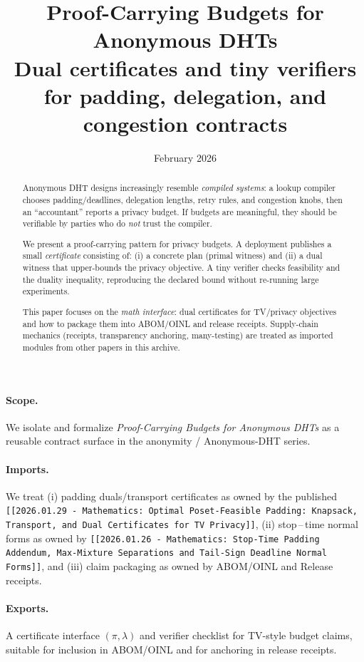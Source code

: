 \documentclass[11pt]{article}
\title{Proof-Carrying Budgets for Anonymous DHTs\\
\large Dual certificates and tiny verifiers for padding, delegation, and congestion contracts}
\author{}
\date{February 2026}
\begin{document}
\maketitle

\begin{abstract}
Anonymous DHT designs increasingly resemble \emph{compiled systems}: a lookup compiler chooses padding/deadlines, delegation lengths, retry rules, and congestion knobs, then an ``accountant'' reports a privacy budget.
If budgets are meaningful, they should be verifiable by parties who do \emph{not} trust the compiler.

We present a proof-carrying pattern for privacy budgets.
A deployment publishes a small \emph{certificate} consisting of: (i) a concrete plan (primal witness) and (ii) a dual witness that upper-bounds the privacy objective.
A tiny verifier checks feasibility and the duality inequality, reproducing the declared bound without re-running large experiments.

This paper focuses on the \emph{math interface}: dual certificates for TV/privacy objectives and how to package them into ABOM/OINL and release receipts.
Supply-chain mechanics (receipts, transparency anchoring, many-testing) are treated as imported modules from other papers in this archive.
\end{abstract}

\paragraph{Scope.}
We isolate and formalize \emph{Proof-Carrying Budgets for Anonymous DHTs} as a reusable contract surface in the anonymity / Anonymous-DHT series.

\paragraph{Imports.}
We treat (i) padding duals/transport certificates as owned by the published \texttt{[[2026.01.29 - Mathematics: Optimal Poset-Feasible Padding: Knapsack, Transport, and Dual Certificates for TV Privacy]]},
(ii) stop\,--\,time normal forms as owned by \texttt{[[2026.01.26 - Mathematics: Stop-Time Padding Addendum, Max-Mixture Separations and Tail-Sign Deadline Normal Forms]]}, and
(iii) claim packaging as owned by ABOM/OINL and Release receipts.\cite{series:abomoinl,series:releaseproperty}

\paragraph{Exports.}
A certificate interface $(\pi,\lambda)$ and verifier checklist for TV-style budget claims, suitable for inclusion in ABOM/OINL and for anchoring in release receipts.\cite{series:abomoinl,series:releaseproperty}
\end{document}

